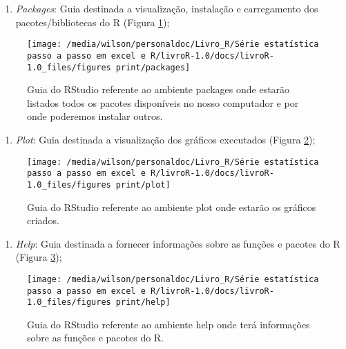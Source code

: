 \documentclass[titlepage, oneside, openany, a4paper]{book}
\providecommand{\tightlist}{%
  \setlength{\itemsep}{0pt}\setlength{\parskip}{0pt}}
\begin{document}
\begin{enumerate}
\def\labelenumi{\arabic{enumi}.}
\setcounter{enumi}{5}
\tightlist
\item
  \emph{Packages}: Guia destinada a visualização, instalação e carregamento dos pacotes/bibliotecas do R (Figura \ref{fig:packages});
\end{enumerate}

\begin{figure}

{\centering \texttt{[image: /media/wilson/personaldoc/Livro\_R/Série estatística passo a passo em excel e R/livroR-1.0/docs/livroR-1.0\_files/figures print/packages]} 

}

\caption{Guia do RStudio referente ao ambiente packages onde estarão listados todos os pacotes disponíveis no nosso computador e por onde poderemos instalar outros.}\label{fig:packages}
\end{figure}

\begin{enumerate}
\def\labelenumi{\arabic{enumi}.}
\setcounter{enumi}{6}
\tightlist
\item
  \emph{Plot}: Guia destinada a visualização dos gráficos executados (Figura \ref{fig:plot});
\end{enumerate}

\begin{figure}

{\centering \texttt{[image: /media/wilson/personaldoc/Livro\_R/Série estatística passo a passo em excel e R/livroR-1.0/docs/livroR-1.0\_files/figures print/plot]} 

}

\caption{Guia do RStudio referente ao ambiente plot onde estarão os gráficos criados.}\label{fig:plot}
\end{figure}

\begin{enumerate}
\def\labelenumi{\arabic{enumi}.}
\setcounter{enumi}{7}
\tightlist
\item
  \emph{Help}: Guia destinada a fornecer informações sobre as funções e pacotes do R (Figura \ref{fig:help});
\end{enumerate}

\begin{figure}

{\centering \texttt{[image: /media/wilson/personaldoc/Livro\_R/Série estatística passo a passo em excel e R/livroR-1.0/docs/livroR-1.0\_files/figures print/help]} 

}

\caption{Guia do RStudio referente ao ambiente help onde terá informações sobre as funções e pacotes do R.}\label{fig:help}
\end{figure}
\end{document}

